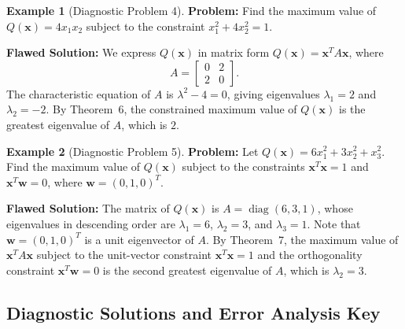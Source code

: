 \documentclass[11pt, letterpaper]{article}
\theoremstyle{definition}
\newtheorem{example}{Example}[section]
\theoremstyle{remark}
\begin{document}
\begin{example}[Diagnostic Problem 4]
\textbf{Problem:} Find the maximum value of $Q(\mathbf{x}) = 4x_1 x_2$ subject to the constraint $x_1^2 + 4x_2^2 = 1$.

\textbf{Flawed Solution:}
We express $Q(\mathbf{x})$ in matrix form $Q(\mathbf{x}) = \mathbf{x}^T A \mathbf{x}$, where
\[
A = \begin{bmatrix} 0 & 2 \\ 2 & 0 \end{bmatrix}.
\]
The characteristic equation of $A$ is $\lambda^2 - 4 = 0$, giving eigenvalues $\lambda_1 = 2$ and $\lambda_2 = -2$. By Theorem~6, the constrained maximum value of $Q(\mathbf{x})$ is the greatest eigenvalue of $A$, which is $2$.
\end{example}

\begin{example}[Diagnostic Problem 5]
\textbf{Problem:} Let $Q(\mathbf{x}) = 6x_1^2 + 3x_2^2 + x_3^2$. Find the maximum value of $Q(\mathbf{x})$ subject to the constraints $\mathbf{x}^T \mathbf{x} = 1$ and $\mathbf{x}^T \mathbf{w} = 0$, where $\mathbf{w} = (0, 1, 0)^T$.

\textbf{Flawed Solution:}
The matrix of $Q(\mathbf{x})$ is $A = \operatorname{diag}(6, 3, 1)$, whose eigenvalues in descending order are $\lambda_1 = 6$, $\lambda_2 = 3$, and $\lambda_3 = 1$. Note that $\mathbf{w} = (0, 1, 0)^T$ is a unit eigenvector of $A$. By Theorem~7, the maximum value of $\mathbf{x}^T A \mathbf{x}$ subject to the unit-vector constraint $\mathbf{x}^T \mathbf{x} = 1$ and the orthogonality constraint $\mathbf{x}^T \mathbf{w} = 0$ is the second greatest eigenvalue of $A$, which is $\lambda_2 = 3$.
\end{example}

\subsection{Diagnostic Solutions and Error Analysis Key}
\label{subsec:diagnostic_key}
\end{document}
